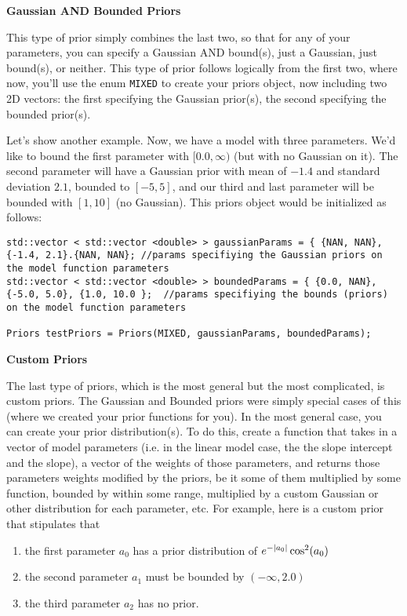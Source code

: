 \documentclass[12pt]{article}
\newcommand{\li}{\lstinline}
\begin{document}
\textbf{Gaussian AND Bounded Priors}
\par This type of prior simply combines the last two, so that for any of your parameters, you can specify a Gaussian AND bound(s), just a Gaussian, just bound(s), or neither. This type of prior follows logically from the first two, where now, you'll use the enum \li{MIXED} to create your priors object, now including two 2D vectors: the first specifying the Gaussian prior(s), the second specifying the bounded prior(s).
\par Let's show another example. Now, we have a model with three parameters. We'd like to bound the first parameter with $[0.0,\infty)$ (but with no Gaussian on it). The second parameter will have a Gaussian prior with mean of $-1.4$ and standard deviation $2.1$, bounded to $[-5,5]$, and our third and last parameter will be bounded with $[1, 10]$ (no Gaussian). This priors object would be initialized as follows:
\newpage
\begin{lstlisting}
std::vector < std::vector <double> > gaussianParams = { {NAN, NAN}, {-1.4, 2.1}.{NAN, NAN}; //params specifiying the Gaussian priors on the model function parameters
std::vector < std::vector <double> > boundedParams = { {0.0, NAN}, {-5.0, 5.0}, {1.0, 10.0 };  //params specifiying the bounds (priors) on the model function parameters

Priors testPriors = Priors(MIXED, gaussianParams, boundedParams);
\end{lstlisting}
\textbf{Custom Priors}
\par The last type of priors, which is the most general but the most complicated, is custom priors. The Gaussian and Bounded priors were simply special cases of this (where we created your prior functions for you). In the most general case, you can create your prior distribution(s). To do this, create a function that takes in a vector of model parameters (i.e. in the linear model case, the the slope intercept and the slope), a vector of the weights of those parameters, and returns those parameters weights modified by the priors, be it some of them multiplied by some function, bounded by within some range, multiplied by a custom Gaussian or other distribution for each parameter, etc. For example, here is a custom prior that stipulates that
\begin{enumerate}
	\item the first parameter $a_0$ has a prior distribution of $e^{-\abs{a_0}}\cos^2(a_0)$ 
	\item the second parameter $a_1$ must be bounded by $(-\infty,2.0)$
	\item the third parameter $a_2$ has no prior.
\end{enumerate}
\end{document}

